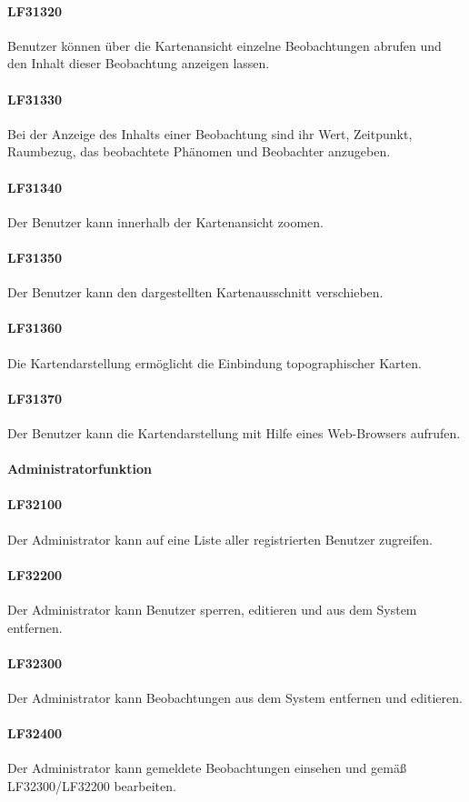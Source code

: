 \documentclass[a4paper,11pt]{article}             %
\begin{document}
\paragraph{LF31320}
Benutzer können über die Kartenansicht einzelne Beobachtungen abrufen und den Inhalt dieser Beobachtung anzeigen lassen.
\paragraph{LF31330}
Bei der Anzeige des Inhalts einer Beobachtung sind ihr Wert, Zeitpunkt, Raumbezug, das beobachtete Phänomen und Beobachter anzugeben.
\paragraph{LF31340}
Der Benutzer kann innerhalb der Kartenansicht zoomen.
\paragraph{LF31350}
Der Benutzer kann den dargestellten Kartenausschnitt verschieben.
\paragraph{LF31360}
Die Kartendarstellung ermöglicht die Einbindung topographischer Karten.
\paragraph{LF31370}
Der Benutzer kann die Kartendarstellung mit Hilfe eines Web-Browsers aufrufen.
\paragraph{Administratorfunktion}
\paragraph{LF32100}
Der Administrator kann auf eine Liste aller registrierten Benutzer zugreifen.
\paragraph{LF32200}
Der Administrator kann Benutzer sperren, editieren und aus dem System entfernen.
\paragraph{LF32300}
Der Administrator kann Beobachtungen aus dem System entfernen und editieren.
\paragraph{LF32400}
Der Administrator kann gemeldete Beobachtungen einsehen und gemäß LF32300/LF32200 bearbeiten.
\end{document}
